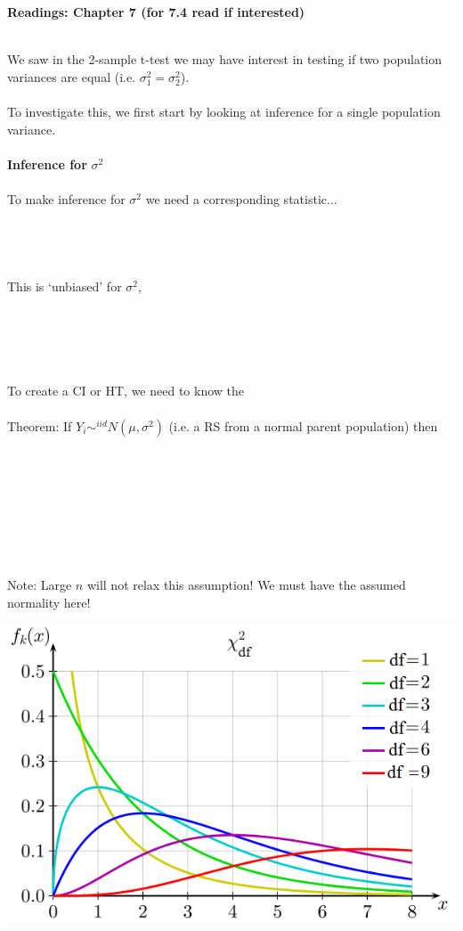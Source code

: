\begin{center}\large\textbf{Readings: Chapter 7 (for 7.4 read if interested)}\\
\normalsize \end{center}
\large ~\hrulefill
~\\
\normalsize
We saw in the 2-sample t-test we may have interest in testing if two population variances are equal (i.e. $\sigma^2_1=\sigma^2_2$).\\~\\
To investigate this, we first start by looking at inference for a single population variance.\\~\\
\large \textbf{Inference for }$\sigma^2$ \normalsize\\~\\
To make inference for $\sigma^2$ we need a corresponding statistic...\\~\\~\\~\\~\\
This is `unbiased' for $\sigma^2$,\\~\\~\\~\\~\\~\\
To create a CI or HT, we need to know the \underbar{~~~~~~~~~~~~~~~~~~~~~~~~~~~~~~~~~~~~~~~~~~~~~~~~~~~~~~~~~~~~~~~~~~~~~~~~~~~~~~~~~~~~~~~~~~~~~}\\~\\
Theorem:  If $Y_i\sim^{iid}N(\mu,\sigma^2)$ (i.e. a RS from a normal parent population) then\\~\\~\\~\\~\\~\\~\\~\\~\\
Note: Large $n$ will not relax this assumption!  We must have the assumed normality here!
\begin{flushleft}
\includegraphics[scale=0.6]{chisquares}
\end{flushleft}~\\
